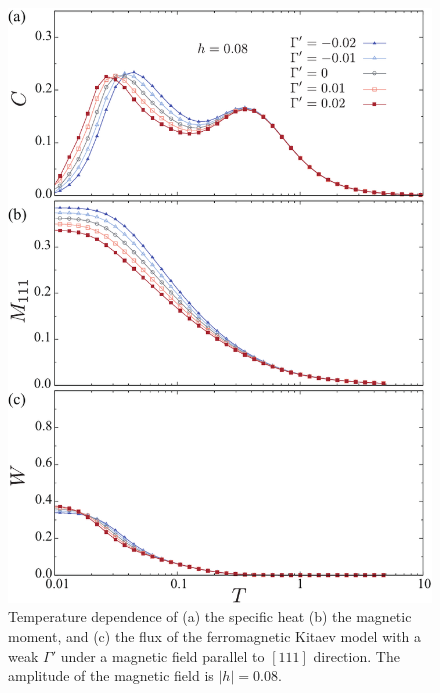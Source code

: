\documentclass[reprint,amsmath,amssymb,aps,prx]{revtex4-2}
\begin{document}
\begin{figure}
  \begin{center}
    \includegraphics[width=0.9\linewidth]{plot_CMF_h0.08_Gp.pdf}
  \end{center}
  \caption{Temperature dependence of (a) the specific heat (b) the magnetic moment, and (c) the flux of the ferromagnetic Kitaev model with a weak $\Gamma'$ under a magnetic field parallel to $[111]$ direction. The amplitude of the magnetic field is $|h|=0.08$.}
  \label{fig:CMF_h0.08_Gp}
\end{figure}
\end{document}

